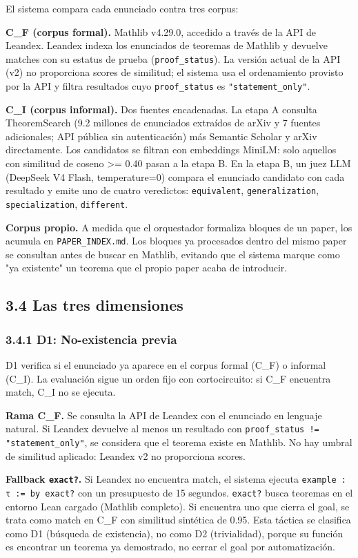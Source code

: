 \documentclass[12pt,a4paper]{article}
\theoremstyle{remark}
\begin{document}
El sistema compara cada enunciado contra tres corpus:

\textbf{C\_F (corpus formal).} Mathlib v4.29.0, accedido a través de la API de Leandex. Leandex indexa los enunciados de teoremas de Mathlib y devuelve matches con su estatus de prueba (\texttt{proof\_status}). La versión actual de la API (v2) no proporciona scores de similitud; el sistema usa el ordenamiento provisto por la API y filtra resultados cuyo \texttt{proof\_status} es \texttt{"statement\_only"}.


\textbf{C\_I (corpus informal).} Dos fuentes encadenadas. La etapa A consulta TheoremSearch (9.2 millones de enunciados extraídos de arXiv y 7 fuentes adicionales; API pública sin autenticación) más Semantic Scholar y arXiv directamente. Los candidatos se filtran con embeddings MiniLM: solo aquellos con similitud de coseno >= 0.40 pasan a la etapa B. En la etapa B, un juez LLM (DeepSeek V4 Flash, temperature=0) compara el enunciado candidato con cada resultado y emite uno de cuatro veredictos: \texttt{equivalent}, \texttt{generalization}, \texttt{specialization}, \texttt{different}.


\textbf{Corpus propio.} A medida que el orquestador formaliza bloques de un paper, los acumula en \texttt{PAPER\_INDEX.md}. Los bloques ya procesados dentro del mismo paper se consultan antes de buscar en Mathlib, evitando que el sistema marque como "ya existente" un teorema que el propio paper acaba de introducir.


\subsection{3.4 Las tres dimensiones}

\subsubsection{3.4.1 D1: No-existencia previa}

D1 verifica si el enunciado ya aparece en el corpus formal (C\_F) o informal (C\_I). La evaluación sigue un orden fijo con cortocircuito: si C\_F encuentra match, C\_I no se ejecuta.


\textbf{Rama C\_F.} Se consulta la API de Leandex con el enunciado en lenguaje natural. Si Leandex devuelve al menos un resultado con \texttt{proof\_status != "statement\_only"}, se considera que el teorema existe en Mathlib. No hay umbral de similitud aplicado: Leandex v2 no proporciona scores.


\textbf{Fallback \texttt{exact?}.} Si Leandex no encuentra match, el sistema ejecuta \texttt{example : τ := by exact?} con un presupuesto de 15 segundos. \texttt{exact?} busca teoremas en el entorno Lean cargado (Mathlib completo). Si encuentra uno que cierra el goal, se trata como match en C\_F con similitud sintética de 0.95. Esta táctica se clasifica como D1 (búsqueda de existencia), no como D2 (trivialidad), porque su función es encontrar un teorema ya demostrado, no cerrar el goal por automatización.
\end{document}
